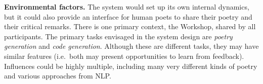 \textbf{Environmental factors.}
The system would set up its own internal dynamics, but it could also
provide an interface for human poets to share their poetry and their
critical remarks.  There is one primary context, the Workshop, shared
by all participants.  The primary tasks envisaged in the system design
are \emph{poetry generation} and \emph{code generation}.  Although
these are different tasks, they may have similar features (i.e.~both may present opportunities to learn from feedback).
Influences could be highly multiple, including many very different kinds of poetry
and various approaches from NLP.
